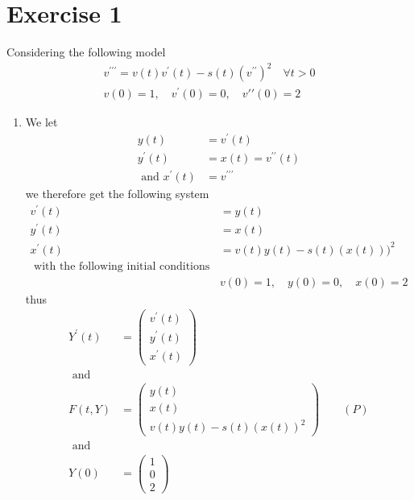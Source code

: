 \documentclass[12pt,a4paper]{article}
\begin{document}
\section*{Exercise 1}
Considering the following model
\begin{align*}
 v^{\prime \prime \prime}  =  v(t) v^\prime(t) - s(t) \left(   v^{\prime \prime} \right)^2 \quad  \forall  t >  0\\
v(0)  = 1, \quad v^\prime(0)  =  0,  \quad v \prime \prime (0)  =  2
\end{align*}
\begin{enumerate}
  \item 
  We let 
\begin{align*}
  y(t)  &=  v ^\prime (t)\\
  y^ \prime (t)  &= x(t)  =  v^{\prime \prime}(t)\\
  \text{ and }  x^\prime (t)  &=   v^{\prime \prime \prime}
\end{align*}
we therefore get the following system 
\begin{align*}
 v ^\prime (t)  &=    y(t)  \\
   y^ \prime (t)  &=   x(t)   \\
   x^\prime (t)   &=   v(t)  y(t)   - s(t)  (x(t)))^2\\
   \text{ with the following initial conditions }\\
  &  v(0)  =  1 , \quad y(0)   =  0, \quad  x(0)   =  2
\end{align*}
thus 
\begin{align*}
Y^\prime(t)  &= \begin{pmatrix}
     v^\prime (t) \\
     y^\prime (t) \\
     x^\prime (t)
\end{pmatrix}\\
\text{ and } \\
F\left(  t, Y\right)  &=  \begin{pmatrix}
		y(t)\\
		x(t)\\
		v(t) y(t)  - s(t) \left(    x(t)  \right)^2
\end{pmatrix} \quad \quad \left( P \right) \\
\text{ and } \\
Y\left( 0  \right)   &=  \begin{pmatrix}
		1\\
		0\\
		2
\end{pmatrix}
\end{align*}

\end{enumerate}
\end{document}
